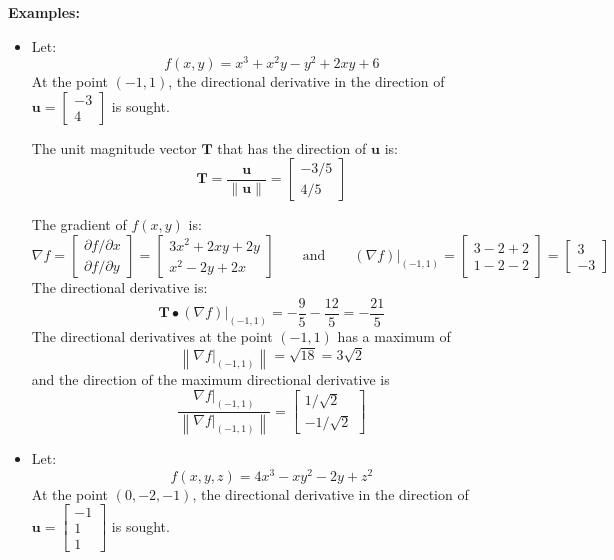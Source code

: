 \documentclass{article}
\begin{document}
\textbf{Examples:}
\begin{itemize}
\item Let: 
\[f(x,y) = x^3 + x^2 y - y^2 + 2xy + 6\]
At the point \((-1, 1)\), the directional derivative in the direction of \(\mathbf{u} = \begin{bmatrix} -3 \\ 4 \end{bmatrix}\) is sought. 

The unit magnitude vector \(\mathbf{T}\) that has the direction of \(\mathbf{u}\) is:
\[\mathbf{T} = \frac{\mathbf{u}}{\|\mathbf{u}\|} = \begin{bmatrix} -3/5 \\ 4/5 \end{bmatrix}\]

The gradient of \(f(x, y)\) is:
\[\nabla f = \begin{bmatrix} \partial f/\partial x \\ \partial f/\partial y \end{bmatrix}
= \begin{bmatrix}
3x^2 + 2xy + 2y \\ 
x^2 - 2y + 2x 
\end{bmatrix} \quad\quad\text{and}\quad\quad (\nabla f)\Big|_{(-1, 1)} = \begin{bmatrix}
3 - 2 + 2 \\ 
1 - 2 - 2
\end{bmatrix} = \begin{bmatrix}
3 \\ 
-3
\end{bmatrix}\]
The directional derivative is:
\[\mathbf{T} \bullet (\nabla f)\Big|_{(-1, 1)} = -\frac{9}{5} - \frac{12}{5} = -\frac{21}{5}\]
The directional derivatives at the point \((-1, 1)\) has a maximum of 
\[\left\|\nabla f\Big|_{(-1, 1)}\right\| = \sqrt{18} = 3\sqrt{2}\]
and the direction of the maximum directional derivative is
\[\frac{\nabla f\Big|_{(-1, 1)}}{\left\|\nabla f\Big|_{(-1, 1)}\right\|} = \begin{bmatrix}
1/\sqrt{2} \\ 
-1/\sqrt{2} 
\end{bmatrix}\]
\item Let: 
\[f(x,y,z) = 4x^3 - x y^2 - 2y + z^2\]
At the point \((0, -2, -1)\), the directional derivative in the direction of \(\mathbf{u} = \begin{bmatrix} -1 \\ 1 \\ 1 \end{bmatrix}\) is sought. 


\end{itemize}
\end{document}
